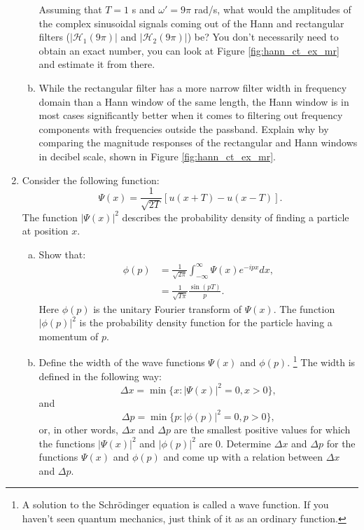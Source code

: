 \begin{enumerate}
\begin{enumerate}[a)]
    Assuming that $T=1$ s and $\omega'=9\pi$ rad/s, what would the
    amplitudes of the complex sinusoidal signals coming out of the 
    Hann and rectangular filters ($|\mathcal{H}_1(9\pi)|$ and
    $|\mathcal{H}_2(9\pi)|$) be? You don't necessarily need to obtain an
    exact number, you can look at Figure \ref{fig:hann_ct_ex_mr} and
    estimate it from there.

    \item While the rectangular filter has a more narrow filter width
    in frequency domain than a Hann window of the same length, the
    Hann window is in most cases significantly better when it comes to
    filtering out frequency components with frequencies outside
    the passband. Explain why by comparing the magnitude responses of
    the rectangular and Hann windows in decibel scale, shown in
    Figure \ref{fig:hann_ct_ex_mr}.
            

      
  \end{enumerate}


\item Consider the following function:
\begin{equation}
\Psi(x) = \frac{1}{\sqrt{2T}}[u(x + T) - u(x - T)].
\end{equation}
The function $|\Psi(x)|^{2}$ describes the probability density of finding a particle at position $x$. 

\begin{enumerate}[a)]
\item Show that:
\begin{align*}
\phi(p)&= \frac{1}{\sqrt{2\pi}}\int_{-\infty}^{\infty}\Psi(x)e^{-ip x}dx, \\
            &= \frac{1}{\sqrt{T\pi}}\frac{\sin(p T)}{p}.
\end{align*}
Here $\phi(p)$ is the unitary Fourier transform of $\Psi(x)$. The function $|\phi(p)|^{2}$ is the probability density function
for the particle having a momentum of $p$. 

\item Define the width of the wave functions $\Psi(x)$ and $\phi(p)$.
\footnote{A solution to the Schrödinger equation is called a wave function. If you haven't seen quantum mechanics,
just think of it as an ordinary function.} The width is defined in the following way:
$$\Delta x = \min\{x : |\Psi(x)|^{2}=0,x>0\},$$
and 
$$\Delta p = \min\{p : |\phi(p)|^{2}=0,p>0\},$$
or, in other words, $\Delta x$ and $\Delta p$ are the smallest positive values for which the functions $|\Psi(x)|^{2}$ and $|\phi(p)|^{2}$ are $0$. Determine $\Delta x$ and $\Delta p$ for the functions $\Psi(x)$ and $\phi(p)$ and come up with a relation between $\Delta x$ and $\Delta p$.


\end{enumerate}
\end{enumerate}
